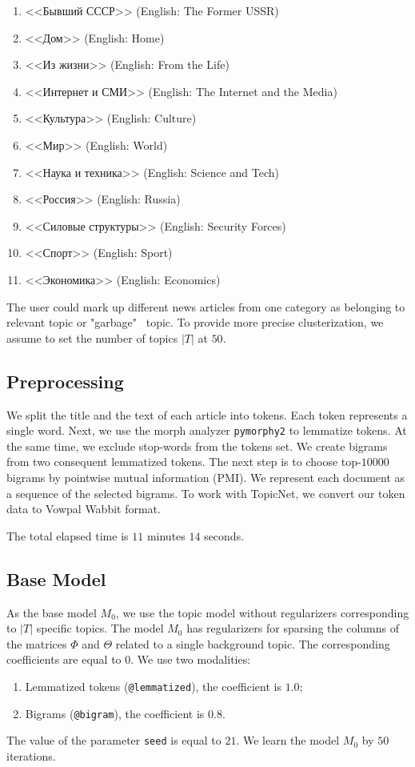 \documentclass{article}
\begin{document}
\begin{enumerate}
    \item <<Бывший СССР>> (English: The Former USSR)
    \item <<Дом>> (English: Home)
    \item <<Из жизни>> (English: From the Life)
    \item <<Интернет и СМИ>> (English: The Internet and the Media)
    \item <<Культура>> (English: Culture)
    \item <<Мир>> (English: World)
    \item <<Наука и техника>> (English: Science and Tech)
    \item <<Россия>> (English: Russia)
    \item <<Силовые структуры>> (English: Security Forces)
    \item <<Спорт>> (English: Sport)
    \item <<Экономика>> (English: Economics)
\end{enumerate}

The user could mark up different news articles from one category as belonging to relevant topic or "garbage" \ topic. To provide more precise clusterization, we assume to set the number of topics $|T|$ at $50$.

\subsection{Preprocessing}

We split the title and the text of each article into tokens.
Each token represents a single word.
Next, we use the morph analyzer \texttt{pymorphy2} \citep{pymorphy2} to lemmatize tokens.
At the same time, we exclude stop-words from the tokens set.
We create bigrams from two consequent lemmatized tokens.
The next step is to choose top-$10 000$ bigrams by pointwise mutual information (PMI).
We represent each document as a sequence of the selected bigrams.
To work with TopicNet, we convert our token data to Vowpal Wabbit format.

The total elapsed time is $11$ minutes $14$ seconds.

\subsection{Base Model}

As the base model $M_0$, we use the topic model without regularizers corresponding to $|T|$ specific topics. The model $M_0$ has regularizers for sparsing the columns of the matrices $\Phi$ and $\Theta$ related to a single background topic. The corresponding coefficients are equal to $0$.
We use two modalities:
\begin{enumerate}
    \item Lemmatized tokens (\texttt{@lemmatized}), the coefficient is $1.0$;
    \item Bigrams (\texttt{@bigram}), the coefficient is $0.8$.
\end{enumerate}
The value of the parameter \texttt{seed} is equal to $21$.
We learn the model $M_0$ by $50$ iterations.
\end{document}
